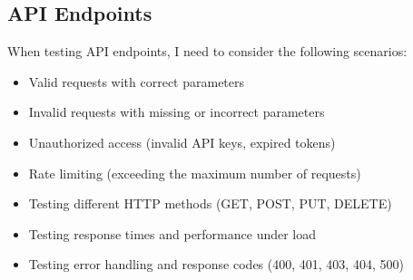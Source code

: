 \documentclass[11pt]{article}
\begin{document}
\subsection{API Endpoints}
When testing API endpoints, I need to consider the following scenarios:
\begin{itemize}
    \item Valid requests with correct parameters
    \item Invalid requests with missing or incorrect parameters
    \item Unauthorized access (invalid API keys, expired tokens)
    \item Rate limiting (exceeding the maximum number of requests)
    \item Testing different HTTP methods (GET, POST, PUT, DELETE)
    \item Testing response times and performance under load
    \item Testing error handling and response codes (400, 401, 403, 404, 500)
\end{itemize}





\end{document}
